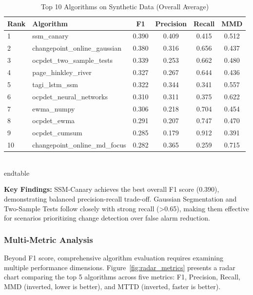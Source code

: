 \begin{table}[H]
\centering
\caption{Top 10 Algorithms on Synthetic Data (Overall Average)}
\label{tab:synthetic_overall}
\small
\begin{tabular}{llcccc}
\toprule
\textbf{Rank} & \textbf{Algorithm} & \textbf{F1} & \textbf{Precision} & \textbf{Recall} & \textbf{MMD} \\
\midrule
1 & ssm\_canary & 0.390 & 0.409 & 0.415 & 0.512 \\
2 & changepoint\_online\_gaussian & 0.380 & 0.316 & 0.656 & 0.437 \\
3 & ocpdet\_two\_sample\_tests & 0.339 & 0.253 & 0.662 & 0.480 \\
4 & page\_hinkley\_river & 0.327 & 0.267 & 0.644 & 0.436 \\
5 & tagi\_lstm\_ssm & 0.322 & 0.344 & 0.341 & 0.557 \\
6 & ocpdet\_neural\_networks & 0.310 & 0.311 & 0.375 & 0.622 \\
7 & ewma\_numpy & 0.306 & 0.218 & 0.704 & 0.454 \\
8 & ocpdet\_ewma & 0.291 & 0.207 & 0.747 & 0.470 \\
9 & ocpdet\_cumsum & 0.285 & 0.179 & 0.912 & 0.391 \\
10 & changepoint\_online\_md\_focus & 0.282 & 0.365 & 0.259 & 0.715 \\
\bottomrule
\end{tabular}
\\end{table}

\textbf{Key Findings:} SSM-Canary achieves the best overall F1 score (0.390), demonstrating balanced precision-recall trade-off. Gaussian Segmentation and Two-Sample Tests follow closely with strong recall (>0.65), making them effective for scenarios prioritizing change detection over false alarm reduction.


\subsubsection{Multi-Metric Analysis}

Beyond F1 score, comprehensive algorithm evaluation requires examining multiple performance dimensions. Figure~\ref{fig:radar_metrics} presents a radar chart comparing the top 5 algorithms across five metrics: F1, Precision, Recall, MMD (inverted, lower is better), and MTTD (inverted, faster is better).


\end{table}
